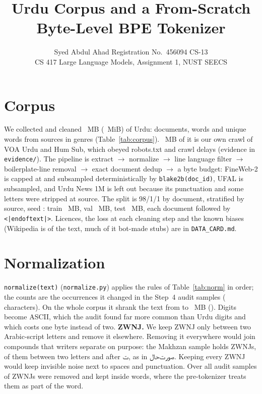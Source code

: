 \documentclass[10pt]{article}
\title{\vspace{-1.6cm}\textbf{Urdu Corpus and a From-Scratch Byte-Level BPE Tokenizer}}
\author{Syed Abdul Ahad \quad Registration No.\ 456094 \quad CS-13\\
  \small CS 417 Large Language Models, Assignment 1, NUST SEECS}
\date{\vspace{-0.9cm}}
\newcommand{\ur}[1]{\foreignlanguage{urdu}{#1}}
\newcommand{\tablefont}{\footnotesize}
\begin{document}
\maketitle

\section{Corpus}
We collected and cleaned \CorpusMB~MB (\CorpusMiB~MiB) of Urdu: \CorpusDocs{} documents, \CorpusWords{} words
and \CorpusUniqueWords{} unique words from \SourcesAll{} sources in \GenresCount{} genres
(Table~\ref{tab:corpus}). \OwnMB~MB of it is our own crawl of VOA Urdu and Hum Sub, which obeyed robots.txt and
crawl delays (evidence in \texttt{evidence/}). The pipeline is extract $\to$ normalize $\to$ line language
filter $\to$ boilerplate-line removal $\to$ exact document dedup $\to$ a byte budget: FineWeb-2 is capped at
\FineWebCap{} and subsampled deterministically by \texttt{blake2b(doc\_id)}, UFAL is subsampled, and Urdu News 1M
is left out because its punctuation and some letters were stripped at source. The split is 98/1/1 by document,
stratified by source, seed \Seed: train \TrainMB~MB, val \ValMB~MB, test \TestMB~MB, each document followed by
\texttt{<|endoftext|>}. Licences, the loss at each cleaning step and the known biases (Wikipedia is
\WikiShare{} of the text, much of it bot-made stubs) are in \texttt{DATA\_CARD.md}.

\begin{table}[!htb]\centering\tablefont

\caption{Sources. Cleaned: after dedup; Corpus: bytes in train+val+test; Kept: budget rate.}\label{tab:corpus}
\end{table}

\section{Normalization}
\texttt{normalize(text)} (\texttt{normalize.py}) applies the rules of Table~\ref{tab:norm} in order; the counts
are the occurrences it changed in the Step~4 audit samples (\AuditChars{} characters). On the whole corpus it
shrank the text from \NormInMB{} to \NormOutMB~MB (\NormShrink). Digits become ASCII, which the audit found far
more common than Urdu digits and which costs one byte instead of two.
\textbf{ZWNJ.} We keep ZWNJ only between two Arabic-script letters and remove it elsewhere. Removing it
everywhere would join compounds that writers separate on purpose: the Makhzan sample holds \ZwnjMakhzan{}
ZWNJs, \ZwnjMakhzanBetween{} of them between two letters and \ZwnjMakhzanTeh{} after \ur{ت}, as in
\ur{صورت‌حال}. Keeping every ZWNJ would keep invisible noise next to spaces and punctuation. Over all audit
samples \ZwnjRemoved{} of \ZwnjRaw{} ZWNJs were removed and \ZwnjKept{} kept inside words, where the
pre-tokenizer treats them as part of the word.
\end{document}
